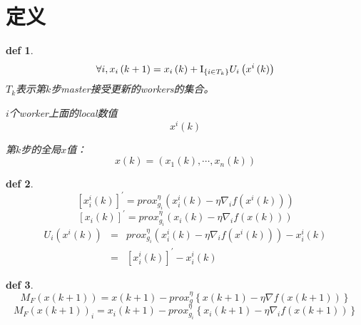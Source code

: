 \documentclass{ctexart}
\begin{document}
\newtheorem{mydef}{def}
\newtheorem{myth}{Th}
\newtheorem{myproof}{Proof}
\newtheorem{myas}{Assumption}

\section{定义}

\begin{mydef}
\begin{equation}\label{eq:1}
  \forall i,{x_i}\left( {k + 1} \right) = {x_i}\left( k \right) + {{\rm I}_{\left\{ {i \in {T_k}} \right\}}}{U_i}\left( {{x^i}\left( k \right)} \right)
\end{equation}
$T_k$表示第$k$步master接受更新的workers的集合。

$i$个worker上面的local数值
\begin{equation}\label{eq:2}
  x^{i}\left(k\right)
\end{equation}

第$k$步的全局$x$值：
\begin{equation}\label{eq:3}
  x\left(k\right)=\left(x_1(k),\cdots,x_n(k)\right)
\end{equation}
\end{mydef}

\begin{mydef}
\begin{equation}\label{eq:4}
   \left[ {x_i^i\left( k \right)} \right]^{'}= prox_{{g_i}}^\eta \left( {x_i^i\left( k \right) - \eta {\nabla _i}f\left( {{x^i}\left( k \right)} \right)} \right)
\end{equation}
\begin{equation}\label{eq:5}
    \left[ {{x_i}\left( k \right)} \right]^{'} = prox_{{g_i}}^\eta \left( {{x_i}\left( k \right) - \eta {\nabla _i}f\left( {x\left( k \right)} \right)} \right)
\end{equation}
\begin{eqnarray}
  {U_i}\left( {{x^i}\left( k \right)} \right) &=& prox_{{g_i}}^\eta \left( {x_i^i\left( k \right) - \eta {\nabla _i}f\left( {{x^i}\left( k \right)} \right)} \right) - x_i^i\left( k \right) \nonumber\\
   &=& {\left[ {x_i^i\left( k \right)} \right]^{'}} - x_i^i\left( k \right)
\end{eqnarray}
\end{mydef}

\begin{mydef}
\begin{equation}\label{eq:6}
  M_F\left(x\left( k+1\right)\right) =  x\left(k+1\right) - prox_{g}^{\eta} \left\{{x}\left( k+1\right) - \eta {\nabla}f\left( x\left(k+1\right)\right)\right\}
\end{equation}
\begin{equation}\label{eq:6.1}
  M_F\left(x\left( k+1\right)\right)_i =  x_i\left(k+1\right) - prox_{g_i}^{\eta} \left\{{x_i}\left( k+1\right) - \eta {\nabla_i}f\left( x\left(k+1\right)\right)\right\}
\end{equation}
\end{mydef}
\end{document}
